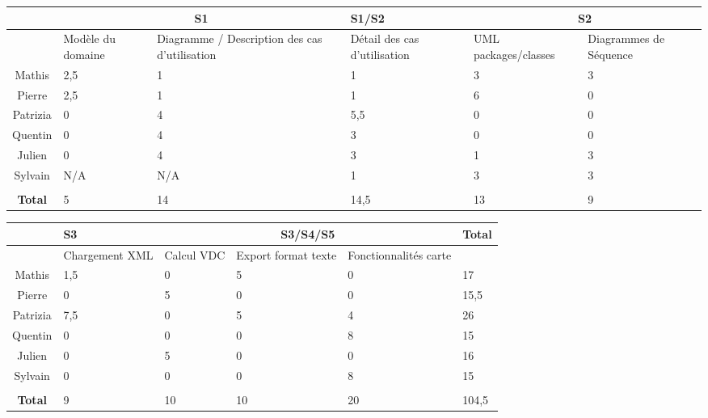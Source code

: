 \documentclass[a4paper]{report}
\begin{document}
\begin{center}
    \begin{tabular}{|c|p{2cm}|p{2cm}|p{2cm}|p{2.3cm}|p{2cm}|}
        \hline
        & \multicolumn{2}{|c|}{S1}  &  S1/S2  &  \multicolumn{2}{|c|}{S2} \\\hline
        & Modèle du domaine & Diagramme / Description des cas d'utilisation &
        Détail des cas d'utilisation & UML packages/classes & Diagrammes de
        Séquence\\\hline
        Mathis & 2,5 & 1 & 1 & 3 & 3\\\hline
        Pierre & 2,5 & 1 & 1 & 6 & 0\\\hline
        Patrizia & 0 & 4 & 5,5 & 0 & 0\\\hline
        Quentin & 0 & 4 & 3 & 0 & 0\\\hline
        Julien & 0 & 4 & 3 & 1 & 3\\\hline
        Sylvain & N/A & N/A & 1 & 3 & 3\\\hline
        \multicolumn{6}{|c|}{}\\\hline
        \textbf{Total} & 5 & 14 & 14,5 & 13 & 9\\\hline
    \end{tabular}
\end{center}

\begin{center}
    \begin{tabular}{|c|p{2cm}|p{2cm}|p{2cm}|p{2.3cm}|p{2cm}|}
        \hline
        & S3 & \multicolumn{3}{|c|}{S3/S4/S5} & \textbf{Total} \\\hline
        & Chargement XML & Calcul VDC & Export format texte & Fonctionnalités
        carte & \\\hline
        Mathis & 1,5 & 0 & 5 & 0 & 17\\\hline
        Pierre & 0 & 5 & 0 & 0 & 15,5\\\hline
        Patrizia & 7,5 & 0 & 5 & 4 & 26\\\hline
        Quentin & 0 & 0 & 0 & 8 & 15\\\hline
        Julien & 0 & 5 & 0 & 0 & 16\\\hline
        Sylvain & 0 & 0 & 0 & 8 & 15\\\hline
        \multicolumn{6}{|c|}{}\\\hline
        \textbf{Total} & 9 & 10 & 10 & 20 & 104,5\\\hline
    \end{tabular}
\end{center}
\end{document}
